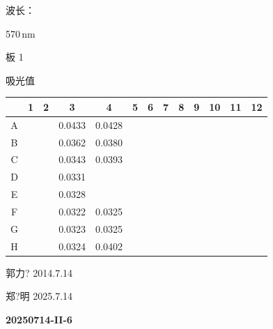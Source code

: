 \documentclass[UTF8,10pt,a4paper,fontset=fandol]{ctexart}
\newcommand{\fieldvalue}[1]{#1}
\newcommand{\handwritten}[1]{#1}
\begin{document}
\medskip
\noindent 波长：

\fieldvalue{570\,nm}

\noindent 板 1

\noindent 吸光值

\begin{center}
\scriptsize
\begin{tabular}{c|*{12}{c}}
 & 1 & 2 & 3 & 4 & 5 & 6 & 7 & 8 & 9 & 10 & 11 & 12\\ \hline
A & & & 0.0433 & 0.0428 & \text{---} & \text{---} & \text{---} & \text{---} & \text{---} & \text{---} & \text{---} & \\ \hline
B & & & 0.0362 & 0.0380 & \text{---} & \text{---} & \text{---} & \text{---} & \text{---} & \text{---} & \text{---} & \\ \hline
C & & & 0.0343 & 0.0393 & \text{---} & \text{---} & \text{---} & \text{---} & \text{---} & \text{---} & \text{---} & \\ \hline
D & & & 0.0331 & \text{---} & \text{---} & \text{---} & \text{---} & \text{---} & \text{---} & \text{---} & \text{---} & \\ \hline
E & & & 0.0328 & \text{---} & \text{---} & \text{---} & \text{---} & \text{---} & \text{---} & \text{---} & \text{---} & \\ \hline
F & & & 0.0322 & 0.0325 & \text{---} & \text{---} & \text{---} & \text{---} & \text{---} & \text{---} & \text{---} & \\ \hline
G & & & 0.0323 & 0.0325 & \text{---} & \text{---} & \text{---} & \text{---} & \text{---} & \text{---} & \text{---} & \\ \hline
H & & & 0.0324 & 0.0402 & \text{---} & \text{---} & \text{---} & \text{---} & \text{---} & \text{---} & \text{---} &
\end{tabular}
\end{center}


\handwritten{郭力? 2014.7.14}

\handwritten{郑?明 2025.7.14}

\newpage

\noindent\textbf{20250714-II-6}
\end{document}

